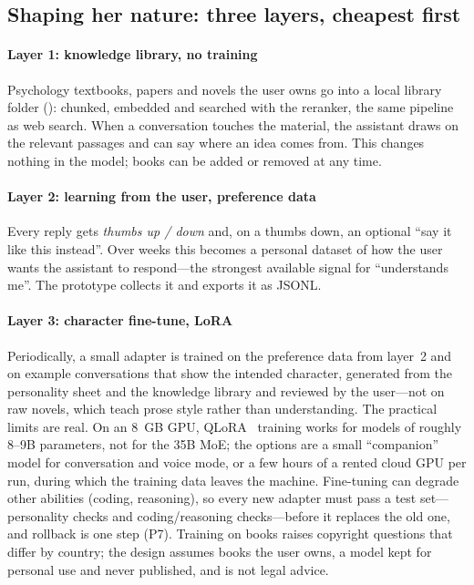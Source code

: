 \subsection{Shaping her nature: three layers, cheapest first}

\paragraph{Layer 1: knowledge library, no training} Psychology textbooks, papers and novels the user owns go into a local library folder (): chunked, embedded and searched with the reranker, the same pipeline as web search. When a conversation touches the material, the assistant draws on the relevant passages and can say where an idea comes from. This changes nothing in the model; books can be added or removed at any time.

\paragraph{Layer 2: learning from the user, preference data} Every reply gets \emph{thumbs up / down} and, on a thumbs down, an optional ``say it like this instead''. Over weeks this becomes a personal dataset of how the user wants the assistant to respond---the strongest available signal for ``understands me''. The prototype collects it and exports it as JSONL.

\paragraph{Layer 3: character fine-tune, LoRA} Periodically, a small adapter is trained on the preference data from layer~2 and on example conversations that show the intended character, generated from the personality sheet and the knowledge library and reviewed by the user---not on raw novels, which teach prose style rather than understanding. The practical limits are real. On an 8~GB GPU, QLoRA~\cite{qlora} training works for models of roughly 8--9B parameters, not for the 35B MoE; the options are a small ``companion'' model for conversation and voice mode, or a few hours of a rented cloud GPU per run, during which the training data leaves the machine. Fine-tuning can degrade other abilities (coding, reasoning), so every new adapter must pass a test set---personality checks and coding/reasoning checks---before it replaces the old one, and rollback is one step (P7). Training on books raises copyright questions that differ by country; the design assumes books the user owns, a model kept for personal use and never published, and is not legal advice.

